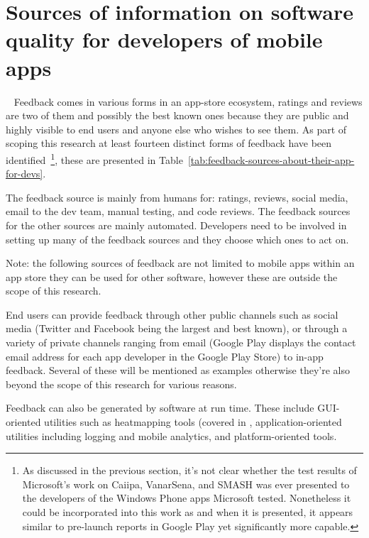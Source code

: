 \section{Sources of information on software quality for developers of mobile apps}~\label{rw-sources-of-info-on-software-quality-for-devs-of-mobile-apps}
Feedback comes in various forms in an app-store ecosystem, ratings and reviews are two of them and possibly the best known ones because they are public and highly visible to end users and anyone else who wishes to see them. As part of scoping this research at least fourteen distinct forms of feedback have been identified~\footnote{As discussed in the previous section, it's not clear whether the test results of Microsoft's work on Caiipa, VanarSena, and SMASH was ever presented to the developers of the Windows Phone apps Microsoft tested. Nonetheless it could be incorporated into this work as and when it is presented, it appears similar to pre-launch reports in Google Play yet significantly more capable.}, these are presented in Table~\ref{tab:feedback-sources-about-their-app-for-devs}.

The feedback source is mainly from humans for: ratings, reviews, social media, email to the dev team, manual testing, and code reviews. The feedback sources for the other sources are mainly automated. Developers need to be involved in setting up many of the feedback sources and they choose which ones to act on.

Note: the following sources of feedback are not limited to mobile apps within an app store they can be used for other software, however these are outside the scope of this research.

End users can provide feedback through other public channels such as social media (Twitter and Facebook being the largest and best known), or through a variety of private channels ranging from email (Google Play displays the contact email address for each app developer in the Google Play Store) to in-app feedback. Several of these will be mentioned as examples otherwise they're also beyond the scope of this research for various reasons. 

Feedback can also be generated by software at run time. These include GUI-oriented utilities such as heatmapping tools (covered in , application-oriented utilities including logging and mobile analytics, and platform-oriented tools.



